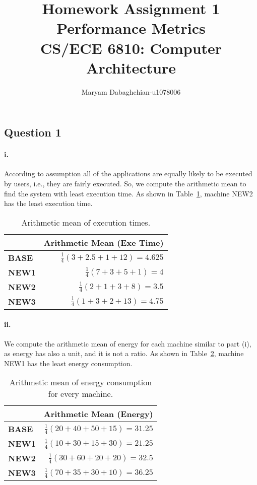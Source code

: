 \documentclass[11pt]{article}
\title{Homework Assignment 1\\
	Performance Metrics\\
	CS/ECE 6810: Computer Architecture}
\author{Maryam Dabaghchian-u1078006}
\newcommand{\q}[1]{\subsection*{Question {#1}}}
\renewcommand{\part}[1]{\paragraph*{{#1}.}}
\begin{document}
\maketitle

\q{1} 

\part{i} According to assumption all of the applications are equally likely to 
be executed by users, i.e., they are fairly executed. So, we compute the 
arithmetic mean to find the system with least execution time. As shown in Table~\ref{tbl:wext}, machine NEW2 has the least execution time. 

\begin{table}[h]
\center
\begin{tabular}{|l|r|}
	\hline
	 & \textbf{Arithmetic Mean (Exe Time)} \\
	\hline
	\textbf{BASE} & $\frac{1}{4}(3 + 2.5 + 1 + 12) = 4.625$  \\
	\hline
	\textbf{NEW1} & $\frac{1}{4}(7 + 3 + 5 + 1) = 4$ \\
	\hline
	\textbf{NEW2} & $\frac{1}{4}(2 + 1 + 3 + 8) = 3.5$ \\
	\hline
	\textbf{NEW3} & $\frac{1}{4}(1 + 3 + 2 + 13) = 4.75$ \\
	\hline
\end{tabular}
\caption{Arithmetic mean of execution times.}
\label{tbl:wext}
\end{table}


\part{ii} We compute the arithmetic mean of energy for each machine similar to 
part (i), as energy has also a unit, and it is not a ratio. As shown in 
Table~\ref{tbl:wenrgy}, machine NEW1 has the least energy consumption.

\begin{table}[h]
\center
\begin{tabular}{|l|r|}
	\hline
	 & \textbf{Arithmetic Mean (Energy)} \\
	\hline
	\textbf{BASE} & $\frac{1}{4}(20 + 40 + 50 + 15) = 31.25$  \\
	\hline
	\textbf{NEW1} & $\frac{1}{4}(10 + 30 + 15 + 30) = 21.25$ \\
	\hline
	\textbf{NEW2} & $\frac{1}{4}(30 + 60 + 20 + 20) = 32.5$ \\
	\hline
	\textbf{NEW3} & $\frac{1}{4}(70 + 35 + 30 + 10) = 36.25$ \\
	\hline
\end{tabular}
\caption{Arithmetic mean of energy consumption for every machine.}
\label{tbl:wenrgy}
\end{table}
\end{document}
